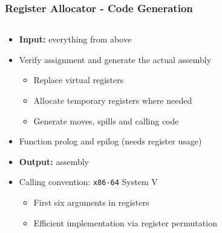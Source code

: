 \documentclass[navbaroff,en]{sdqbeamer}
\begin{document}
\begin{frame}
\frametitle{Register Allocator - Code Generation}

\begin{columns}
	\begin{column}{0.7\textwidth}
		\begin{itemize}
			\item \textbf{Input:} everything from above
			\item Verify assignment and generate the actual assembly
			\begin{itemize}
				\item Replace virtual registers
				\item Allocate temporary registers where needed
				\item Generate moves, spills and calling code
			\end{itemize}
			\item Function prolog and epilog (needs register usage)
			\item \textbf{Output:} assembly
		\end{itemize}
	
		\vspace{10pt}
		\begin{itemize}
			\item Calling convention: \texttt{x86-64} System V
			\begin{itemize}
				\item First six arguments in registers
				\item Efficient implementation via register permutation
			\end{itemize}
		\end{itemize}
	\end{column}
	

\end{columns}
\end{frame}
\end{document}
